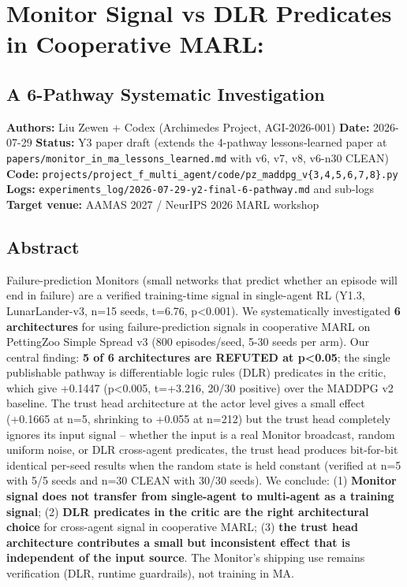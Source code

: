 \documentclass[
]{article}
\author{}
\date{}
\begin{document}
\section{Monitor Signal vs DLR Predicates in Cooperative
MARL:}\label{monitor-signal-vs-dlr-predicates-in-cooperative-marl}

\subsection{A 6-Pathway Systematic
Investigation}\label{a-6-pathway-systematic-investigation}

\textbf{Authors:} Liu Zewen + Codex (Archimedes Project, AGI-2026-001)
\textbf{Date:} 2026-07-29 \textbf{Status:} Y3 paper draft (extends the
4-pathway lessons-learned paper at
\texttt{papers/monitor\_in\_ma\_lessons\_learned.md} with v6, v7, v8,
v6-n30 CLEAN) \textbf{Code:}
\texttt{projects/project\_f\_multi\_agent/code/pz\_maddpg\_v\{3,4,5,6,7,8\}.py}
\textbf{Logs:}
\texttt{experiments\_log/2026-07-29-y2-final-6-pathway.md} and sub-logs
\textbf{Target venue:} AAMAS 2027 / NeurIPS 2026 MARL workshop

\subsection{Abstract}\label{abstract}

Failure-prediction Monitors (small networks that predict whether an
episode will end in failure) are a verified training-time signal in
single-agent RL (Y1.3, LunarLander-v3, n=15 seeds, t=6.76,
p\textless0.001). We systematically investigated \textbf{6
architectures} for using failure-prediction signals in cooperative MARL
on PettingZoo Simple Spread v3 (800 episodes/seed, 5-30 seeds per arm).
Our central finding: \textbf{5 of 6 architectures are REFUTED at
p\textless0.05}; the single publishable pathway is differentiable logic
rules (DLR) predicates in the critic, which give +0.1447
(p\textless0.005, t=+3.216, 20/30 positive) over the MADDPG v2 baseline.
The trust head architecture at the actor level gives a small effect
(+0.1665 at n=5, shrinking to +0.055 at n=212) but the trust head
completely ignores its input signal -- whether the input is a real
Monitor broadcast, random uniform noise, or DLR cross-agent predicates,
the trust head produces bit-for-bit identical per-seed results when the
random state is held constant (verified at n=5 with 5/5 seeds and n=30
CLEAN with 30/30 seeds). We conclude: (1) \textbf{Monitor signal does
not transfer from single-agent to multi-agent as a training signal}; (2)
\textbf{DLR predicates in the critic are the right architectural choice}
for cross-agent signal in cooperative MARL; (3) \textbf{the trust head
architecture contributes a small but inconsistent effect that is
independent of the input source}. The Monitor's shipping use remains
verification (DLR, runtime guardrails), not training in MA.
\end{document}
